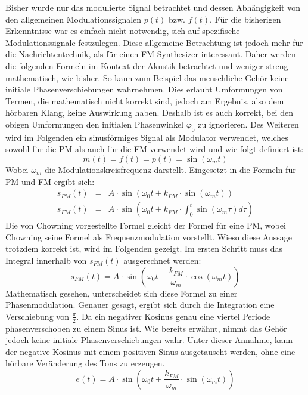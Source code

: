 Bisher wurde nur das modulierte Signal betrachtet und dessen Abhängigkeit von den allgemeinen Modulationssignalen \(p(t)\) bzw. \(f(t)\). Für die bisherigen Erkenntnisse war es einfach nicht notwendig, sich auf spezifische Modulationssignale festzulegen. Diese allgemeine Betrachtung ist jedoch mehr für die Nachrichtentechnik, als für einen FM-Synthesizer interessant.
Daher werden die folgenden Formeln im Kontext der Akustik betrachtet und weniger streng mathematisch, wie bisher. So kann zum Beispiel das menschliche Gehör keine initiale Phasenverschiebungen wahrnehmen. Dies erlaubt Umformungen von Termen, die mathematisch nicht korrekt sind, jedoch am Ergebnis, also dem hörbaren Klang, keine Auswirkung haben. Deshalb ist es auch korrekt, bei den obigen Umformungen den initialen Phasenwinkel $\varphi_0$ zu ignorieren. Des Weiteren wird im Folgenden ein sinusförmiges Signal als Modulator verwendet, welches sowohl für die PM als auch für die FM verwendet wird und wie folgt definiert ist:
\begin{equation}
m(t)=f(t)=p(t)=\sin(\omega_m t)
\end{equation}
Wobei \(\omega_m\) die Modulationskreisfrequenz darstellt. Eingesetzt in die Formeln für PM und FM ergibt sich:
\begin{eqnarray*}
s_{PM}(t)&=&A\cdot\sin(\omega_0t+k_{PM}\cdot\sin(\omega_m t)) \\
s_{FM}(t)&=&A\cdot\sin(\omega_0t+k_{FM}\cdot\int_0^t{\sin(\omega_m \tau)} d\tau)
\end{eqnarray*}
Die von Chowning vorgestellte Formel gleicht der Formel für eine PM, \cite{chowningPaper} wobei Chowning seine Formel als Frequenzmodulation vorstellt. Wieso diese Aussage trotzdem korrekt ist, wird im Folgenden gezeigt. Im ersten Schritt muss das Integral innerhalb von \(s_{FM}(t)\) ausgerechnet werden:
\begin{equation*}
s_{FM}(t)=A\cdot\sin(\omega_0t-\frac{k_{FM}}{\omega_m}\cdot\cos(\omega_m t))
\end{equation*}
Mathematisch gesehen, unterscheidet sich diese Formel zu einer Phasenmodulation. Genauer gesagt, ergibt sich durch die Integration eine Verschiebung von $\frac{\pi}{2}$. Da ein negativer Kosinus genau eine viertel Periode phasenverschoben zu einem Sinus ist. Wie bereits erwähnt, nimmt das Gehör jedoch keine initiale Phasenverschiebungen wahr. Unter dieser Annahme, kann der negative Kosinus mit einem positiven Sinus ausgetauscht werden, ohne eine hörbare Veränderung des Tons zu erzeugen.
\begin{equation*}
e(t)=A\cdot\sin(\omega_0t+\frac{k_{FM}}{\omega_m}\cdot\sin(\omega_m t))
\end{equation*}
